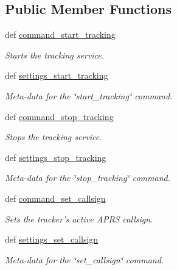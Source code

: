 \subsection*{Public Member Functions}
\begin{DoxyCompactItemize}
\item 
def \hyperlink{classhwm_1_1hardware_1_1devices_1_1drivers_1_1mxl__balloon__tracker_1_1mxl__balloon__tracker_1_1_balloon_handler_a6951fb907a005831fdecc5aef575b577}{command\-\_\-start\-\_\-tracking}
\begin{DoxyCompactList}\small\item\em Starts the tracking service. \end{DoxyCompactList}\item 
def \hyperlink{classhwm_1_1hardware_1_1devices_1_1drivers_1_1mxl__balloon__tracker_1_1mxl__balloon__tracker_1_1_balloon_handler_a740a4bddc714d3e77f8d4d17afd4389f}{settings\-\_\-start\-\_\-tracking}
\begin{DoxyCompactList}\small\item\em Meta-\/data for the \char`\"{}start\-\_\-tracking\char`\"{} command. \end{DoxyCompactList}\item 
def \hyperlink{classhwm_1_1hardware_1_1devices_1_1drivers_1_1mxl__balloon__tracker_1_1mxl__balloon__tracker_1_1_balloon_handler_af04447c432a010b4808d107b469dce5e}{command\-\_\-stop\-\_\-tracking}
\begin{DoxyCompactList}\small\item\em Stops the tracking service. \end{DoxyCompactList}\item 
def \hyperlink{classhwm_1_1hardware_1_1devices_1_1drivers_1_1mxl__balloon__tracker_1_1mxl__balloon__tracker_1_1_balloon_handler_aaa8d5ec961c6f7eccf8f06c1dad1d70c}{settings\-\_\-stop\-\_\-tracking}
\begin{DoxyCompactList}\small\item\em Meta-\/data for the \char`\"{}stop\-\_\-tracking\char`\"{} command. \end{DoxyCompactList}\item 
def \hyperlink{classhwm_1_1hardware_1_1devices_1_1drivers_1_1mxl__balloon__tracker_1_1mxl__balloon__tracker_1_1_balloon_handler_a34870073e0440be4f31bc438a3cdc068}{command\-\_\-set\-\_\-callsign}
\begin{DoxyCompactList}\small\item\em Sets the tracker's active A\-P\-R\-S callsign. \end{DoxyCompactList}\item 
def \hyperlink{classhwm_1_1hardware_1_1devices_1_1drivers_1_1mxl__balloon__tracker_1_1mxl__balloon__tracker_1_1_balloon_handler_a9ad83f8658ffe2942320a533d6667d78}{settings\-\_\-set\-\_\-callsign}
\begin{DoxyCompactList}\small\item\em Meta-\/data for the \char`\"{}set\-\_\-callsign\char`\"{} command. \end{DoxyCompactList}\end{DoxyCompactItemize}



